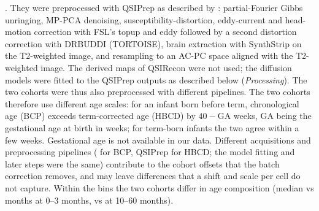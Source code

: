 \documentclass[11pt]{article}
\begin{document}
\citep{dean2024hbcdmri,cieslak2025hbcd}. They were preprocessed with QSIPrep as described by \citet{cieslak2025hbcd}:
partial-Fourier Gibbs unringing, MP-PCA denoising, susceptibility-distortion, eddy-current and head-motion correction
with FSL's topup and eddy followed by a second distortion correction with DRBUDDI (TORTOISE), brain extraction with
SynthStrip on the T2-weighted image, and resampling to an AC-PC space aligned with the T2-weighted image. The derived
maps of QSIRecon were not used; the diffusion models were fitted to the QSIPrep outputs as described below
(\emph{Processing}). The two cohorts were thus also preprocessed with different pipelines. The two cohorts therefore use different age scales: for an infant born before term, chronological age (BCP) exceeds
term-corrected age (HBCD) by $40-\text{GA}$ weeks, GA being the gestational age at birth in weeks; for term-born infants
the two agree within a few weeks. Gestational age is not available in our data. Different acquisitions and preprocessing pipelines ( for BCP, QSIPrep for HBCD;
the model fitting and later steps were the same) contribute to the cohort offsets that the batch correction removes, and may leave differences that a
shift and scale per cell do not capture. Within the bins the two cohorts differ in age composition (median \ageMedBcpA{} vs \ageMedHbcdA{} months
at 0--3 months, \ageMedBcpC{} vs \ageMedHbcdC{} at 10--60 months).
\end{document}
